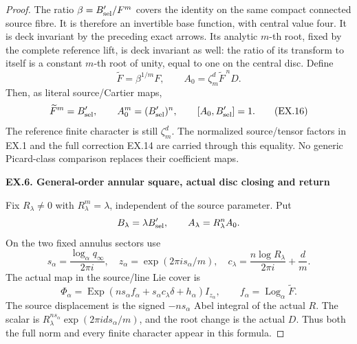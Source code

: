 \begin{proof}
The ratio \(\beta=B'_{{\rm sel}}/F^m\) covers the identity
on the same compact connected source fibre. It is therefore
an invertible base function, with central value four. It is
deck invariant by the preceding exact arrows. Its analytic
\(m\)-th root, fixed by the complete reference lift, is deck
invariant as well: the ratio of its transform to itself is a
constant \(m\)-th root of unity, equal to one on the central
disc. Define
\[
 \widetilde F=\beta^{1/m}F,\qquad
 A_0=\zeta_m^d\widetilde F^{\,n}D.
\]
Then, as literal source/Cartier maps,
\[
 \widetilde F^m=B'_{{\rm sel}},\qquad
 A_0^m=(B'_{{\rm sel}})^n,\qquad
 [A_0,B'_{{\rm sel}}]=1.
 \tag{EX.16}
\]
The reference finite character is still \(\zeta_m^d\).
The normalized source/tensor factors in EX.1 and the full
correction EX.14 are carried through this equality. No generic
Picard-class comparison replaces their coefficient maps.

\par

\medskip\noindent\textbf{EX.6. General-order annular square, actual disc closing and return}

\par\nobreak

Fix \(R_\lambda\ne0\) with \(R_\lambda^m=\lambda\),
independent of the source parameter. Put
\[
 B_\lambda=\lambda B'_{{\rm sel}},\qquad
 A_\lambda=R_\lambda^n A_0.
\]
On the two fixed annulus sectors use
\[
 s_\alpha=\frac{\log_\alpha q_\infty}{2\pi i},\quad
 z_\alpha=\exp(2\pi i s_\alpha/m),\quad
 c_\lambda=\frac{n\log R_\lambda}{2\pi i}+\frac dm.
\]
The actual map in the source/line Lie cover is
\[
 \Phi_\alpha=\operatorname{Exp}
       (n s_\alpha f_\alpha+s_\alpha c_\lambda\delta
                   +h_\alpha)I_{z_\alpha},
 \qquad f_\alpha=\operatorname{Log}_\alpha\widetilde F.
 \tag{EX.17}
\]
The source displacement is the signed \(-n s_\alpha\) Abel
integral of the actual \(R\). The scalar is
\(R_\lambda^{n s_\alpha}\exp(2\pi i d s_\alpha/m)\),
and the root change is the actual \(D\). Thus both the full
norm and every finite character appear in this formula.


\end{proof}
